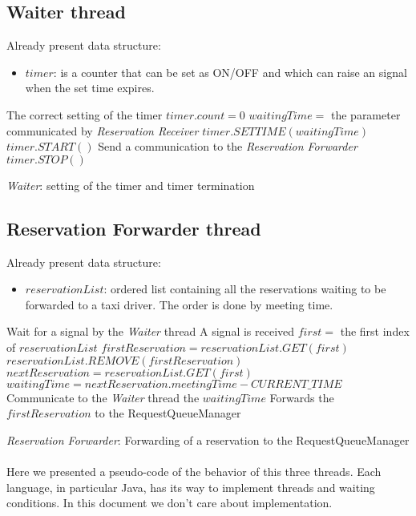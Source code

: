 \subsection{Waiter thread}
\begin{algorithm}[H]
\begin{algorithmic}
\REQUIRE Already present data structure:
\begin{itemize}
	\item $timer$: is a counter that can be set as ON/OFF and which can raise an signal when the set time expires.
\end{itemize}
\ENSURE The correct setting of the timer
\STATE
\STATE $timer.count = 0$ 
		\STATE $waitingTime=$ the parameter communicated by \textit{Reservation Receiver}
		\STATE $timer.SETTIME(waitingTime)$
		\STATE $timer.START()$
	\ENDIF
		\STATE Send a communication to the \textit{Reservation Forwarder}
		\STATE $timer.STOP()$
	\ENDIF
\ENDWHILE
\end{algorithmic}
\caption{\textit{Waiter}: setting of the timer and timer termination}
\end{algorithm}
\subsection{Reservation Forwarder thread}
\begin{algorithm}[H]
\begin{algorithmic}
\REQUIRE Already present data structure:
\begin{itemize}
	\item $reservationList$: ordered list containing all the reservations waiting to be forwarded to a taxi driver. The order is done by meeting time.
\end{itemize}
	\STATE Wait for a signal by the \textit{Waiter} thread
	\STATE A signal is received
	\STATE $first=$ the first index of $reservationList$
	\STATE $firstReservation=reservationList.GET(first)$ 
	\STATE $reservationList.REMOVE(firstReservation)$ 
	\STATE $nextReservation = reservationList.GET(first)$
	\STATE $waitingTime = nextReservation.meetingTime - CURRENT\_TIME$
	\STATE Communicate to the \textit{Waiter} thread the $waitingTime$
	\STATE Forwards the $firstReservation$ to the RequestQueueManager
\ENDWHILE
\end{algorithmic}
\caption{\textit{Reservation Forwarder}: Forwarding of a reservation to the RequestQueueManager}
\end{algorithm}

\paragraph{} Here we presented a pseudo-code of the behavior of this three threads. Each language, in particular Java, has its way to implement threads and waiting conditions. In this document we don't care about implementation.